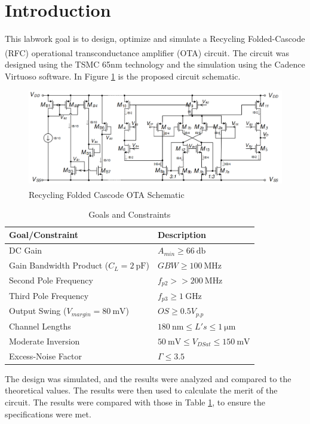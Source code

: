 \section{Introduction}

This labwork goal is to design, optimize and simulate a Recycling Folded-Cascode (RFC) operational transconductance amplifier (OTA) circuit\textsuperscript{\cite{artigo-prof}}.
The circuit was designed using the TSMC 65nm technology and the simulation using the Cadence Virtuoso software. In Figure \ref{fig:OTA_schematic} is the proposed circuit schematic.

\begin{figure}[H]
    \centering
    \includegraphics[width=1\textwidth]{Images/RFC_OTA_schematic.png}
    \caption{Recycling Folded Cascode OTA Schematic\textsuperscript{\cite{Lab-statement}}}
    \label{fig:OTA_schematic}
\end{figure}

\begin{table}[H]
    \centering
    \caption{Goals and Constraints}
    \begin{tabularx}{\textwidth}{>{\centering\arraybackslash}X >{\centering\arraybackslash}X}
        \toprule
        \textbf{Goal/Constraint} & \textbf{Description}\\
        \midrule
        DC Gain & $A_{min}\geq \SI{66}{\decibel}$\\
        \midrule
        Gain Bandwidth Product ($C_L = \SI{2}{\pico\farad}$) & $GBW\geq\SI{100}{\mega\hertz}$ \\
        \midrule
        Second Pole Frequency & $f_{p2}>>\SI{200}{\mega\hertz}$ \\
        \midrule
        Third Pole Frequency & $f_{p3} \geq \SI{1}{\giga\hertz}$ \\
        \midrule
        Output Swing ($V_{margin}=\SI{80}{\milli\volt}$) & $OS\geq 0.5 V_{p.p}$ \\
        \midrule
        Channel Lengths & $\SI{180}{\nano\meter} \leq L's \leq \SI{1}{\micro\meter} $ \\
        \midrule
        Moderate Inversion & $\SI{50}{\milli\volt} \leq V_{DSat} \leq \SI{150}{\milli\volt}$ \\
        \midrule
        Excess-Noise Factor & $\Gamma \leq 3.5 $\\
        \bottomrule
    \end{tabularx}
    \label{tab:goals}
\end{table}

The design was simulated, and the results were analyzed and compared to the theoretical values. The results were then used to calculate the merit of the circuit. The results were compared with those in Table \ref{tab:goals}, to ensure the specifications were met.

\pagebreak

